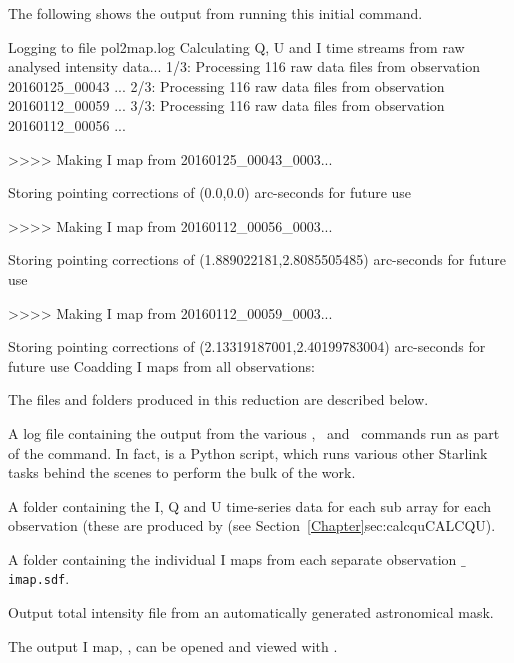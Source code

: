 The following shows the output from running this initial 
command.

\begin{terminalv}
Logging to file pol2map.log
Calculating Q, U and I time streams from raw analysed intensity data...
   1/3: Processing 116 raw data files from observation 20160125_00043 ...
   2/3: Processing 116 raw data files from observation 20160112_00059 ...
   3/3: Processing 116 raw data files from observation 20160112_00056 ...

>>>>   Making I map from 20160125_00043_0003...

Storing pointing corrections of (0.0,0.0) arc-seconds for future use

>>>>   Making I map from 20160112_00056_0003...

Storing pointing corrections of (1.889022181,2.8085505485) arc-seconds for future use

>>>>   Making I map from 20160112_00059_0003...

Storing pointing corrections of (2.13319187001,2.40199783004) arc-seconds for future use
Coadding I maps from all observations:
\end{terminalv}

The files and folders produced in this reduction are described below.

\begin{aligndesc}
\item[\file{pol2map.log}] A log file containing the output from the
  various \SMURF, \KAPPA\ and \POLPACK\ commands run as part of the 
  command. In fact,  is a Python script, which runs various other
  Starlink tasks behind the scenes to perform the bulk of the work.

\item[\file{qudata/}] A folder containing the I, Q and U time-series data
  for each sub array for each observation (these are produced by
   (see Section~\cref{Chapter}{sec:calcqu}{CALCQU}).

\item[\file{maps/}] A folder containing the individual I maps from
  each separate observation \texttt{$\_$imap.sdf}.

\item[\file{iauto.sdf}] Output total intensity file from an
  automatically generated astronomical mask.

\end{aligndesc}

The output I map, , can be opened and viewed with \GAIA.

